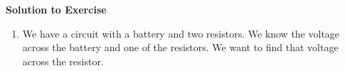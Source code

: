 {\begin{mdframed}[linewidth=4, leftmargin=40, rightmargin=40]
\begin{exercise}
 \par 
        \vspace{5pt}
        \label{m38772*solfhsst!!!underscore!!!id798}\noindent\textbf{Solution to Exercise } \label{m38772*listfhsst!!!underscore!!!id798}\begin{enumerate}[noitemsep, label=\textbf{Step} \textbf{\arabic*}. ] 
            \leftskip=20pt\rightskip=\leftskip\item  
        \label{m38772*id65136}We have a circuit with a battery and two resistors. We know the voltage across the battery and one of the resistors. We want to find that voltage across the resistor.\par 
        \label{m38772*id65141}\nopagebreak\noindent{}
    

\end{enumerate}
\end{exercise}
\end{mdframed}}
